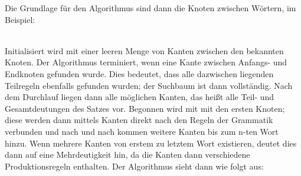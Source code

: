 \documentclass[12pt]{paper}
\begin{document}
Die Grundlage für den Algorithmus sind dann die Knoten zwischen Wörtern, im Beispiel: \\

\\
Initialisiert wird mit einer leeren Menge von Kanten zwischen den bekannten Knoten. Der Algorithmus terminiert, wenn eine Kante zwischen Anfangs- und Endknoten gefunden wurde. Dies bedeutet, dass alle dazwischen liegenden Teilregeln ebenfalls gefunden wurden; der Suchbaum ist dann vollständig. Nach dem Durchlauf liegen dann alle möglichen Kanten, das heißt alle Teil- und Gesamtdeutungen des Satzes vor. Begonnen wird mit mit den ersten Knoten; diese werden dann mittels Kanten direkt nach den Regeln der Grammatik verbunden und nach und nach kommen weitere Kanten bis zum n-ten Wort hinzu. Wenn mehrere Kanten von erstem zu letztem Wort existieren, deutet dies dann auf eine Mehrdeutigkeit hin, da die Kanten dann verschiedene Produktionsregeln enthalten. Der Algorithmus sieht dann wie folgt aus:
\end{document}
